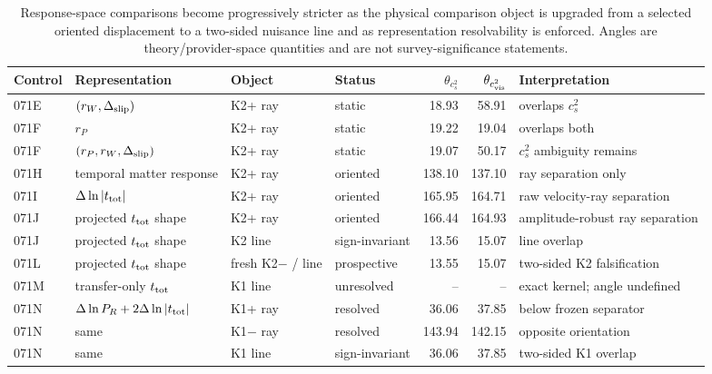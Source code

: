 \begin{table}[t]
\centering
\caption{Response-space comparisons become progressively stricter as the physical comparison object is upgraded from a selected oriented displacement to a two-sided nuisance line and as representation resolvability is enforced. Angles are theory/provider-space quantities and are not survey-significance statements.}
\label{tab:terminal-comparison}
\footnotesize
\setlength{\tabcolsep}{3pt}
\begin{tabularx}{\textwidth}{@{}l >{\raggedright\arraybackslash}X l l rr >{\raggedright\arraybackslash}X@{}}
\toprule
Control & Representation & Object & Status & $\theta_{c_s^2}$ & $\theta_{c_{\rm vis}^2}$ & Interpretation \\
\midrule
071E & $(r_W,\Delta_{\rm slip})$ & K2+ ray & static & 18.93 & 58.91 & overlaps $c_s^2$ \\
071F & $r_P$ & K2+ ray & static & 19.22 & 19.04 & overlaps both \\
071F & $(r_P,r_W,\Delta_{\rm slip})$ & K2+ ray & static & 19.07 & 50.17 & $c_s^2$ ambiguity remains \\
071H & temporal matter response & K2+ ray & oriented & 138.10 & 137.10 & ray separation only \\
071I & $\Delta\ln|t_{\rm tot}|$ & K2+ ray & oriented & 165.95 & 164.71 & raw velocity-ray separation \\
071J & projected $t_{\rm tot}$ shape & K2+ ray & oriented & 166.44 & 164.93 & amplitude-robust ray separation \\
071J & projected $t_{\rm tot}$ shape & K2 line & sign-invariant & 13.56 & 15.07 & line overlap \\
071L & projected $t_{\rm tot}$ shape & fresh K2$-$ / line & prospective & 13.55 & 15.07 & two-sided K2 falsification \\
071M & transfer-only $t_{\rm tot}$ & K1 line & unresolved & -- & -- & exact kernel; angle undefined \\
071N & $\Delta\ln P_R+2\Delta\ln|t_{\rm tot}|$ & K1+ ray & resolved & 36.06 & 37.85 & below frozen separator \\
071N & same & K1$-$ ray & resolved & 143.94 & 142.15 & opposite orientation \\
071N & same & K1 line & sign-invariant & 36.06 & 37.85 & two-sided K1 overlap \\
\bottomrule
\end{tabularx}
\end{table}
